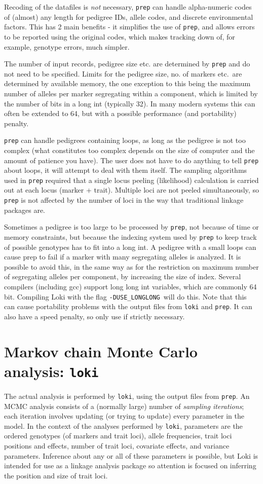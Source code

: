\documentclass[10pt,a4paper]{article}
\newcommand{\Prep}{\texttt{prep}\xspace}
\newcommand{\Loki}{\texttt{loki}\xspace}
\begin{document}
Recoding of the datafiles is \emph{not} necessary, \Prep can
handle alpha-numeric codes of (almost) any length for pedigree IDs, allele
codes, and discrete environmental factors.  This has 2 main benefits - it
simplifies the use of \Prep, and allows errors to be reported using the
original codes, which makes tracking down of, for example, genotype errors,
much simpler.

The number of input records, pedigree size etc. are determined by \Prep and
do not need to be specified.  Limits for the pedigree size, no. of markers
etc.\ are determined by available memory, the one exception to this being
the maximum number of alleles per marker segregating within a component,
which is limited by the number of bits in a long int (typically 32).  In
many modern systems this can often be extended to 64, but with a possible
performance (and portability) penalty.

\Prep can handle pedigrees containing loops, as long as the pedigree is not
too complex (what constitutes too complex depends on the size of computer
and the amount of patience you have).  The user does not have to do anything
to tell \Prep about loops, it will attempt to deal with them itself.  The
sampling algorithms used in \Prep required that a single locus peeling
(likelihood) calculation is carried out at each locus (marker + trait).
Multiple loci are not peeled simultaneously, so \Prep is not affected by the
number of loci in the way that traditional linkage packages are.

Sometimes a pedigree is too large to be processed by \Prep, not because of
time or memory constraints, but because the indexing system used by \Prep to
keep track of possible genotypes has to fit into a long int.  A pedigree
with a small loops can cause prep to fail if a marker with many segregating
alleles is analyzed. It is possible to avoid this, in the same way as for
the restriction on maximum number of segregating alleles per component, by
increasing the size of index.  Several compilers (including gcc) support
long long int variables, which are commonly 64 bit.  Compiling Loki with the
flag \verb+-DUSE_LONGLONG+\ will do this. Note that this can cause portability
problems with the output files from \Loki and \Prep.  It can also have a
speed penalty, so only use if strictly necessary.
\section{Markov chain Monte Carlo analysis: \Loki}
The actual analysis is performed by \Loki, using the output files from \Prep.
An MCMC analysis consists of a (normally large) number of \emph{sampling
iterations}; each iteration involves updating (or trying to update) every
parameter in the model.  In the context of the analyses performed by \Loki,
parameters are the ordered genotypes (of markers and trait loci), allele
frequencies, trait loci positions and effects, number of trait loci,
covariate effects, and variance parameters.  Inference about any or all of
these parameters is possible, but Loki is intended for use as a linkage
analysis package so attention is focused on inferring the position and size
of trait loci.
\end{document}
